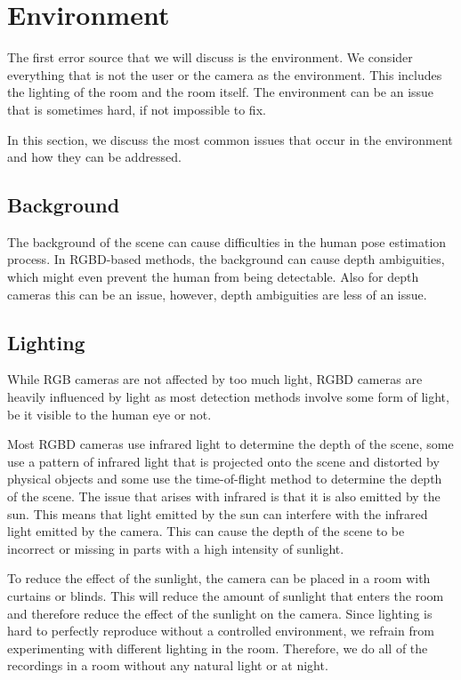 \section{Environment}

The first error source that we will discuss is the environment. We consider everything that is not the user or the camera as the environment. This includes the lighting of the room and the room itself. The environment can be an issue that is sometimes hard, if not impossible to fix. 

In this section, we discuss the most common issues that occur in the environment and how they can be addressed.

\subsection{Background}

The background of the scene can cause difficulties in the human pose estimation process. In RGBD-based methods, the background can cause depth ambiguities, which might even prevent the human from being detectable. Also for depth cameras this can be an issue, however, depth ambiguities are less of an issue.

\subsection{Lighting}

While RGB cameras are not affected by too much light, RGBD cameras are heavily influenced by light as most detection methods involve some form of light, be it visible to the human eye or not.

Most RGBD cameras use infrared light to determine the depth of the scene, some use a pattern of infrared light that is projected onto the scene and distorted by physical objects and some use the time-of-flight method to determine the depth of the scene. The issue that arises with infrared is that it is also emitted by the sun. This means that light emitted by the sun can interfere with the infrared light emitted by the camera. This can cause the depth of the scene to be incorrect or missing in parts with a high intensity of sunlight.

To reduce the effect of the sunlight, the camera can be placed in a room with curtains or blinds. This will reduce the amount of sunlight that enters the room and therefore reduce the effect of the sunlight on the camera. Since lighting is hard to perfectly reproduce without a controlled environment, we refrain from experimenting with different lighting in the room. Therefore, we do all of the recordings in a room without any natural light or at night.

